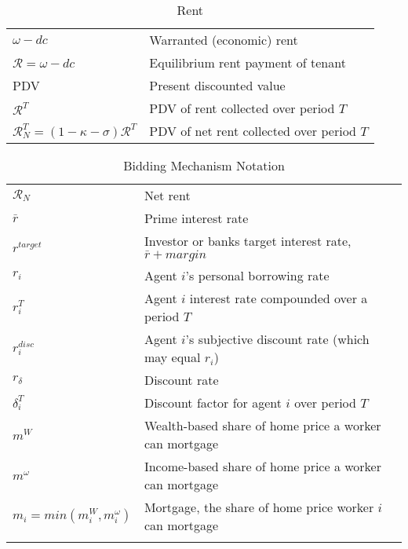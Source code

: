 \newpage

\begin{longtable}{lp{10cm}}
\caption{Rent}                                                            \\
\hline
$\omega-{dc}$                &  Warranted (economic) rent                \\
$\mathcal{R}=\omega-{dc}$    &  Equilibrium rent payment of tenant       \\
PDV                           &  Present discounted value                 \\  
$\mathcal{R}^T$               &  PDV of rent collected over period $T$    \\ 
$\mathcal{R}^T_N=(1-\kappa-\sigma)\mathcal{R}^T$  &  PDV of net rent collected over period $T$ \\
\hline
\end{longtable}

\begin{longtable}{lp{10cm}}
\caption{Bidding Mechanism Notation}                                          \\
\hline
$\mathcal{R}_N$  &  Net rent                                                  \\ %
$\bar r$         &  Prime interest rate                                       \\
$r^{target}$     &  Investor or banks target interest rate, $\bar r + margin$ \\
$r_i$            &  Agent $i$'s personal borrowing rate                       \\
$r_i^T$          &  Agent $i$ interest rate compounded over a period $T$      \\
$r_i^{disc}$     &  Agent $i$'s subjective discount rate (which may equal $r_i$) \\
$r_\delta$       &  Discount rate                                             \\ %
$\delta_i^T$     &  Discount factor for agent $i$ over period $T$             \\
$m^W$            &  Wealth-based share of home price a worker can mortgage    \\ %
$m^\omega$       &  Income-based share of home price a worker can mortgage    \\ %
$m_i = min(m^W_i, m^\omega_i)$  & Mortgage, the share of home price worker $i$ can mortgage \\

\hline
\color{black}
\end{longtable}  

